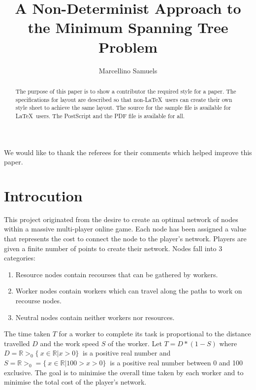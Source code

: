 \documentclass{AISB2008}
\begin{document}
\title{A Non-Determinist Approach to the Minimum Spanning Tree Problem}

\author{Marcellino Samuels }

\maketitle



\begin{abstract}
The purpose of this paper is to show a contributor the required
style for a paper. The specifications
for layout are described so that non-\LaTeX\ users can create their
own style sheet to achieve the same layout. The source for the
sample file is available for \LaTeX\ users. The PostScript and the
PDF file is available for all.
\end{abstract}

\ack
We would like to thank the referees for their comments which helped improve
this paper.

\tableofcontents

\section{Introcution}


This project originated from the desire to create an optimal network of nodes within a massive multi-player online game. Each node has been assigned a value that represents the cost to connect the node to the player’s network. Players are given a finite number of points to create their network. Nodes fall into 3 categories:

\begin{enumerate}
\item Resource nodes contain recourses that can be gathered by workers.
\item Worker nodes contain workers which can travel along the paths to work on recourse nodes.
\item Neutral nodes contain neither workers nor resources.
\end {enumerate}

The time taken {$T$} for a worker to complete its task is proportional to the distance travelled {$D$} and the work speed {$S$} of the worker. Let {$T = D * (1 - S)$} where {$D = {\mathbb{R}}>_0 \{\ x \in {\mathbb{R} | x > 0\}\ }$} is a positive real number and {$S = {\mathbb{R}}>_0 = \{\ x \in {\mathbb{R}} | 100 > x > 0 \}\  $} is a positive real number between 0 and 100 exclusive. The goal is to minimise the overall time taken by each worker and to minimise the total cost of the player’s network.
\end{document}
